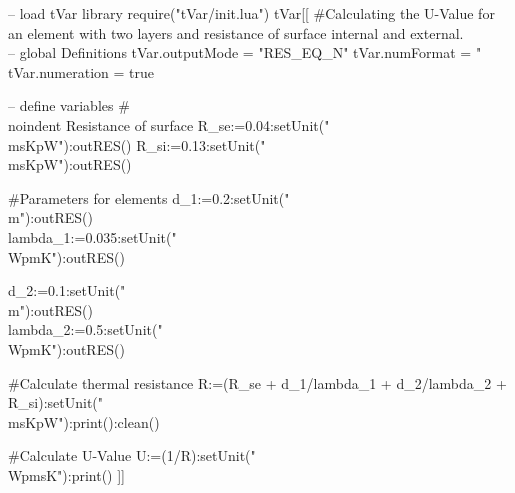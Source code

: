 \documentclass{article}
\newcommand{\msKpW}{\tfrac{m^2K}{W}}
\newcommand{\WpmsK}{\tfrac{W}{m^2K}}
\newcommand{\WpmK}{\tfrac{W}{mK}}
\newcommand{\m}{m}
\begin{document}
\begin{luacode}
	-- load tVar library
	require("tVar/init.lua")
tVar[[
	#Calculating the U-Value for an element with two layers and resistance of surface internal and external.\\

	-- global Definitions
	tVar.outputMode = "RES_EQ_N"
	tVar.numFormat = "%
	tVar.numeration = true
		
	-- define variables
	#\\noindent Resistance of surface
	R_se:=0.04:setUnit("\\msKpW"):outRES()
	R_si:=0.13:setUnit("\\msKpW"):outRES()
	
	#Parameters for elements
	d_1:=0.2:setUnit("\\m"):outRES()
	\\lambda_1:=0.035:setUnit("\\WpmK"):outRES()
	
	d_2:=0.1:setUnit("\\m"):outRES()
	\\lambda_2:=0.5:setUnit("\\WpmK"):outRES()
	
	#Calculate thermal resistance
	R:=(R_se + d_1/lambda_1 + d_2/lambda_2 + R_si):setUnit("\\msKpW"):print():clean()
	
	#Calculate U-Value
	U:=(1/R):setUnit("\\WpmsK"):print()
]]
\end{luacode}
\end{document}
